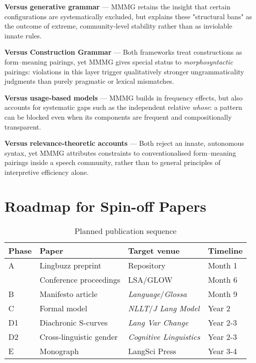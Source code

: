 \documentclass[12pt]{article}
\begin{document}
\textbf{Versus generative grammar} —  
MMMG retains the insight that certain configurations are systematically excluded, but explains these "structural bans" as the outcome of extreme, community‑level stability rather than as inviolable innate rules.

\textbf{Versus Construction Grammar} —  
Both frameworks treat constructions as form–meaning pairings, yet MMMG gives special status to \emph{morphosyntactic} pairings: violations in this layer trigger qualitatively stronger ungrammaticality judgments than purely pragmatic or lexical mismatches.

\textbf{Versus usage‑based models} —  
MMMG builds in frequency effects, but also accounts for systematic gaps such as the independent relative \textit{whose}: a pattern can be blocked even when its components are frequent and compositionally transparent.

\textbf{Versus relevance‑theoretic accounts} —  
Both reject an innate, autonomous syntax, yet MMMG attributes constraints to conventionalised form–meaning pairings inside a speech community, rather than to general principles of interpretive efficiency alone.


\section{Roadmap for Spin-off Papers}

\begin{table}[htbp]
\centering
\small
\caption{Planned publication sequence}
\begin{tabular}{@{}llll@{}}
\toprule
Phase & Paper & Target venue & Timeline \\
\midrule
A & Lingbuzz preprint & Repository & Month 1 \\
& Conference proceedings & LSA/GLOW & Month 6 \\
B & Manifesto article & \textit{Language}/\textit{Glossa} & Month 9 \\
C & Formal model & \textit{NLLT}/\textit{J Lang Model} & Year 2 \\
D1 & Diachronic S-curves & \textit{Lang Var Change} & Year 2-3 \\
D2 & Cross-linguistic gender & \textit{Cognitive Linguistics} & Year 2-3 \\
E & Monograph & LangSci Press & Year 3-4 \\
\bottomrule
\end{tabular}
\end{table}
\end{document}
